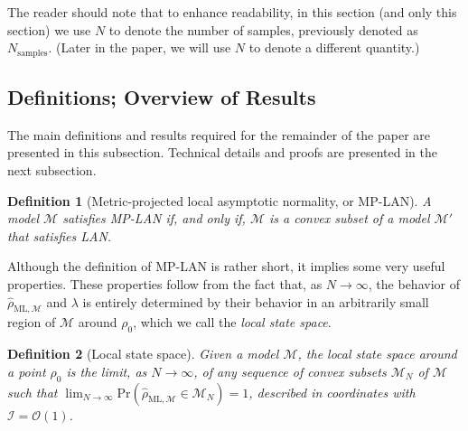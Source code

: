 \documentclass[aps,pra, twocolumn]{revtex4-1}
\newcommand{\M}{\mathcal{M}}
\newcommand{\rhohat}{\hat{\rho}}
\newcommand{\rhoML}[1]{\rhohat_{\scriptscriptstyle{\mathrm{ML},#1}}}
\newtheorem{mydef}{Definition}
\begin{document}
The reader should note that to enhance readability, in this section (and only this section) we use $N$ to denote the number of samples, previously denoted as $N_{\mathrm{samples}}$. (Later in the paper, we will use $N$ to denote a different quantity.)


\subsection{Definitions; Overview of Results}
\label{sec:lanoverview}
The main definitions and results required for the remainder of the paper are presented in this subsection. Technical details and proofs are presented in the next subsection.

\begin{mydef}[Metric-projected local asymptotic normality, or MP-LAN]
A  model $\M$ satisfies MP-LAN if, and only if, $\M$ is a convex subset of a model $\M'$ that satisfies LAN.
\end{mydef}

Although the definition of MP-LAN is rather short, it implies some very useful properties. These properties follow from the fact that, as $N \rightarrow \infty$, the behavior of $\rhoML{\M}$ and $\lambda$ is entirely determined by their behavior in an arbitrarily small region of $\M$ around $\rho_{0}$, which we call the \emph{local state space}.

\begin{mydef}[Local state space]
Given a model $\M$, the local state space around a point $\rho_{0}$ is the limit, as $N \rightarrow \infty$, of any sequence of convex subsets $\M_{N}$ of $\M$ such that $\lim_{N\rightarrow \infty}\mathrm{Pr}(\rhoML{\M} \in \M_{N}) =1$, described in coordinates with $\mathcal{I} = \mathcal{O}(1)$.
\end{mydef}
\end{document}
